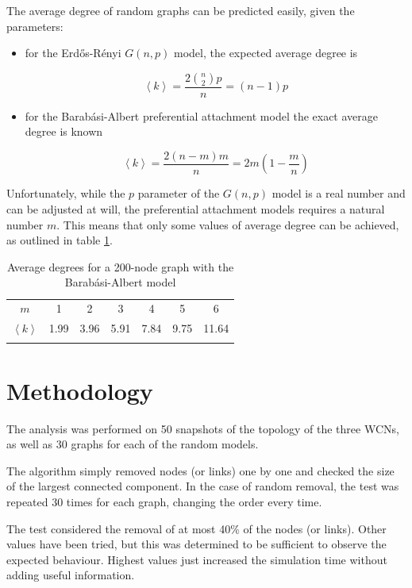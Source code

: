 \documentclass[a4paper,11pt,twoside,openright]{memoir}
\begin{document}
The average degree of random graphs can be predicted easily, given the
parameters:

\begin{itemize}
\item
  for the Erd\H{o}s-Rényi $G(n,p)$ model, the expected average degree is

  \begin{equation}
  \left< k \right> = \frac{2 \binom{n}{2} p}{n} = (n-1)p
  \end{equation}
\item
  for the Barabási-Albert preferential attachment model the exact
  average degree is known

  \begin{equation}
  \left< k \right> = \frac{2 (n-m)m}{n} = 2m\left( 1 - \frac{m}{n} \right)
  \end{equation}
\end{itemize}

Unfortunately, while the $p$ parameter of the $G(n,p)$ model is a real
number and can be adjusted at will, the preferential attachment models
requires a natural number $m$. This means that only some values of
average degree can be achieved, as outlined in table \ref{tbl:b-a_degrees}.

\begin{longtable}[c]{@{}ccccccc@{}}
\toprule\addlinespace
$m$ & 1 & 2 & 3 & 4 & 5 & 6
\\\addlinespace
$\left< k \right>$ & 1.99 & 3.96 & 5.91 & 7.84 & 9.75 & 11.64
\\\addlinespace
\bottomrule
\addlinespace
\caption{Average degrees for a 200-node graph with the Barabási-Albert
model}
\label{tbl:b-a_degrees}
\end{longtable}

\section{Methodology}\label{methodology}

The analysis was performed on 50 snapshots of the topology of the three
WCNs, as well as 30 graphs for each of the random models.

The algorithm simply removed nodes (or links) one by one and checked the
size of the largest connected component. In the case of random removal,
the test was repeated 30 times for each graph, changing the order every
time.

The test considered the removal of at most 40\% of the nodes (or links).
Other values have been tried, but this was determined to be sufficient
to observe the expected behaviour. Highest values just increased the
simulation time without adding useful information.
\end{document}
